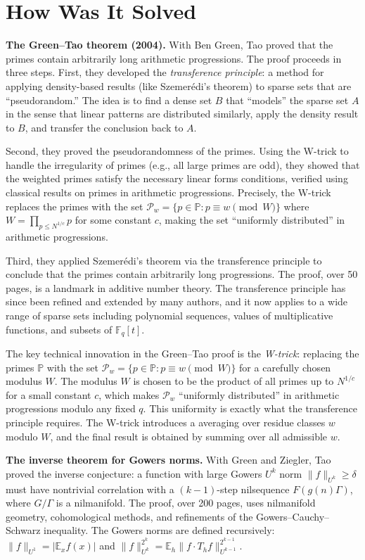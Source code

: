 \section{How Was It Solved}

\textbf{The Green--Tao theorem \cite{greentao2008} (2004).} With Ben Green, Tao proved that the primes contain arbitrarily long arithmetic progressions. The proof proceeds in three steps. First, they developed the \emph{transference principle}: a method for applying density-based results (like Szemer\'edi's theorem) to sparse sets that are ``pseudorandom.'' The idea is to find a dense set $B$ that ``models'' the sparse set $A$ in the sense that linear patterns are distributed similarly, apply the density result to $B$, and transfer the conclusion back to $A$.

Second, they proved the pseudorandomness of the primes. Using the W-trick to handle the irregularity of primes (e.g., all large primes are odd), they showed that the weighted primes satisfy the necessary linear forms conditions, verified using classical results on primes in arithmetic progressions. Precisely, the W-trick replaces the primes with the set $\mathcal{P}_w = \{p \in \mathbb{P} : p \equiv w \pmod{W}\}$ where $W = \prod_{p \le N^{1/c}} p$ for some constant $c$, making the set ``uniformly distributed'' in arithmetic progressions.

Third, they applied Szemer\'edi's theorem via the transference principle to conclude that the primes contain arbitrarily long progressions. The proof, over 50 pages, is a landmark in additive number theory. The transference principle has since been refined and extended by many authors, and it now applies to a wide range of sparse sets including polynomial sequences, values of multiplicative functions, and subsets of $\mathbb{F}_q[t]$.

The key technical innovation in the Green--Tao proof is the \emph{W-trick}: replacing the primes $\mathbb{P}$ with the set $\mathcal{P}_w = \{p \in \mathbb{P} : p \equiv w \pmod{W}\}$ for a carefully chosen modulus $W$. The modulus $W$ is chosen to be the product of all primes up to $N^{1/c}$ for a small constant $c$, which makes $\mathcal{P}_w$ ``uniformly distributed'' in arithmetic progressions modulo any fixed $q$. This uniformity is exactly what the transference principle requires. The W-trick introduces a averaging over residue classes $w$ modulo $W$, and the final result is obtained by summing over all admissible $w$.

\textbf{The inverse theorem for Gowers norms.} With Green and Ziegler, Tao proved the inverse conjecture: a function with large Gowers $U^k$ norm $\|f\|_{U^k} \ge \delta$ must have nontrivial correlation with a $(k-1)$-step nilsequence $F(g(n)\Gamma)$, where $G/\Gamma$ is a nilmanifold. The proof, over 200 pages, uses nilmanifold geometry, cohomological methods, and refinements of the Gowers--Cauchy--Schwarz inequality. The Gowers norms are defined recursively: $\|f\|_{U^1} = |\mathbb{E}_x f(x)|$ and $\|f\|_{U^k}^{2^k} = \mathbb{E}_h \|f \cdot T_h f\|_{U^{k-1}}^{2^{k-1}}$.

